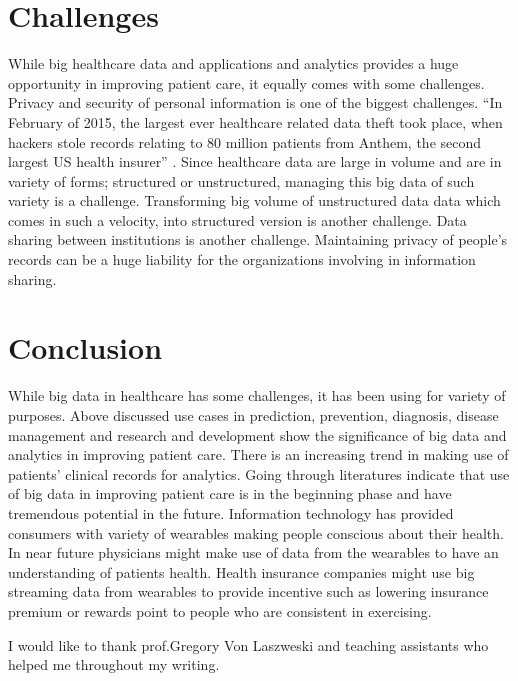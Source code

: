 \documentclass[sigconf]{acmart}
\begin{document}
\section{Challenges}
While big healthcare data and applications and analytics provides a huge opportunity in improving patient care, it equally 
comes with some challenges. 
Privacy and security of personal information is one of the biggest challenges.
``In February of 2015, the largest ever healthcare related data theft took place, when hackers stole records relating to 80
million patients 
from Anthem, the second largest US health insurer'' \cite{www-forbes-com}.
Since healthcare data are large in volume and are in variety of forms; structured or unstructured, managing this big data of 
such variety is a challenge. Transforming big volume of unstructured data data which comes in such a velocity, into structured
version is another challenge. Data sharing between institutions is another challenge. Maintaining privacy of people's records 
can be a huge liability for the organizations involving in information sharing.




\section{Conclusion}
While big data in healthcare has some challenges, it  has been using for variety of purposes. Above discussed use cases in prediction, prevention, diagnosis, disease management and research and development show the significance of big data and analytics in improving patient care. There is an increasing trend in making use of patients' clinical records for analytics.  
Going through literatures indicate that use of big data in improving patient care is in the beginning phase and have tremendous potential in the future. Information technology 
has provided consumers with variety of wearables making people conscious about their health. In near future physicians might 
make use of data from the wearables to have an understanding of patients health. Health insurance companies might use big streaming 
data from wearables to provide incentive such as lowering  insurance premium or rewards point to people who are consistent in exercising.


\begin{acks}

I would like to thank prof.Gregory Von Laszweski and teaching assistants who helped me throughout my writing. 
\end{acks}


 
\end{document}
